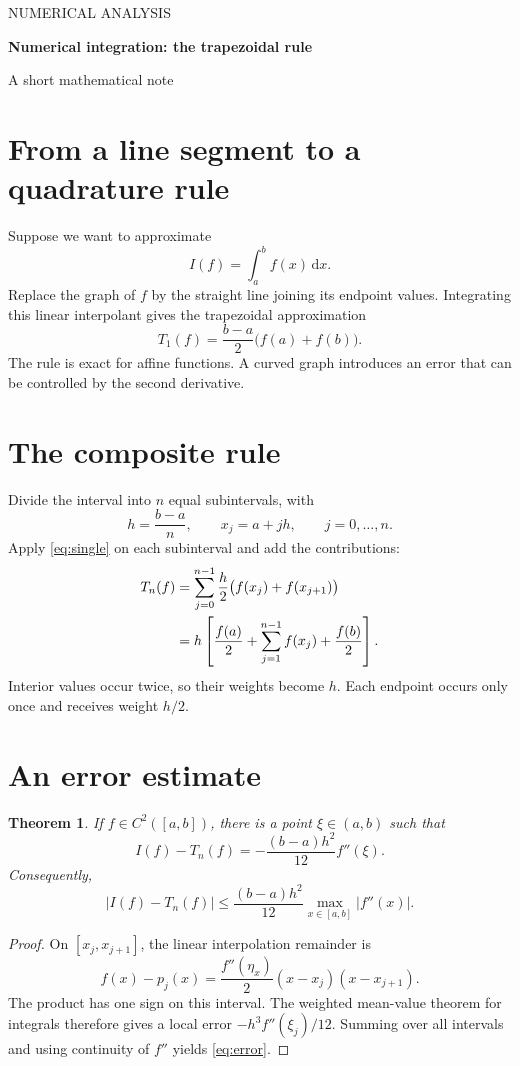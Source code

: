 \documentclass[10pt,a4paper]{article}
\newtheorem{theorem}{Theorem}
\begin{document}
{\small\color{teal}NUMERICAL ANALYSIS}\par
{\LARGE\bfseries Numerical integration: the trapezoidal rule}\par
{\small\color{muted}A short mathematical note}\par
\vspace{6pt}

\section{From a line segment to a quadrature rule}
Suppose we want to approximate
\[
I(f)=\int_a^b f(x)\,\mathrm{d}x.
\]
Replace the graph of \(f\) by the straight line joining its endpoint values. Integrating this linear interpolant gives the trapezoidal approximation
\begin{equation}
T_1(f)=\frac{b-a}{2}\bigl(f(a)+f(b)\bigr).
\label{eq:single}
\end{equation}
The rule is exact for affine functions. A curved graph introduces an error that can be controlled by the second derivative.

\section{The composite rule}
Divide the interval into \(n\) equal subintervals, with
\[
h=\frac{b-a}{n},\qquad x_j=a+jh,\qquad j=0,\ldots,n.
\]
Apply \eqref{eq:single} on each subinterval and add the contributions:
\begin{align}
T_n(f)
&=\sum_{j=0}^{n-1}\frac{h}{2}
  \bigl(f(x_j)+f(x_{j+1})\bigr) \notag\\
&=h\left[\frac{f(a)}2+\sum_{j=1}^{n-1}f(x_j)+\frac{f(b)}2\right].
\label{eq:composite}
\end{align}
Interior values occur twice, so their weights become \(h\). Each endpoint occurs only once and receives weight \(h/2\).

\section{An error estimate}
\begin{theorem}
If \(f\in C^2([a,b])\), there is a point \(\xi\in(a,b)\) such that
\begin{equation}
I(f)-T_n(f)=-\frac{(b-a)h^2}{12}f''(\xi).
\label{eq:error}
\end{equation}
Consequently,
\[
|I(f)-T_n(f)|\le
\frac{(b-a)h^2}{12}\max_{x\in[a,b]}|f''(x)|.
\]
\end{theorem}
\begin{proof}
On \([x_j,x_{j+1}]\), the linear interpolation remainder is
\[
f(x)-p_j(x)=\frac{f''(\eta_x)}{2}(x-x_j)(x-x_{j+1}).
\]
The product has one sign on this interval. The weighted mean-value theorem for integrals therefore gives a local error
\(-h^3f''(\xi_j)/12\). Summing over all intervals and using continuity of \(f''\) yields \eqref{eq:error}.
\end{proof}
\end{document}

